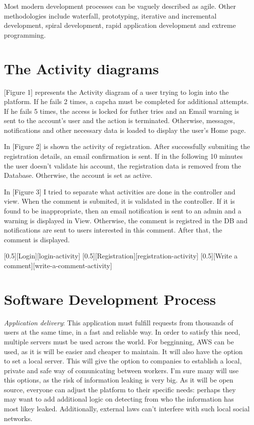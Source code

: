 \documentclass{article}
\begin{document}
			Most modern development processes can be vaguely described as agile. Other methodologies include waterfall, prototyping, iterative and incremental development, spiral development, rapid application development and extreme programming.

	\section{The Activity diagrams}
		[Figure 1] represents the Activity diagram of a user trying to login into the platform. If he fails 2 times, a capcha must be completed for additional attempts. If he fails 5 times, the access is locked for futher tries and an Email warning is sent to the account's user and the action is terminated. Otherwise, messages, notifications and other necessary data is loaded to display the user's Home page.

		\bigskip
		In [Figure 2] is shown the activity of registration. After successfully submiting the registration details, an email confirmation is sent. If in the following 10 minutes the user doesn't validate his account, the registration data is removed from the Database. Otherwise, the account is set as active.

		\bigskip
		In [Figure 3] I tried to separate what activities are done in the controller and view. When the comment is submited, it is validated in the controller. If it is found to be inappropriate, then an email notification is sent to an admin and a warning is displayed in View. Otherwise, the comment is registred in the DB and notifications are sent to users interested in this comment. After that, the comment is displayed.

		[0.5][Login][login-activity]
		[0.5][Registration][registration-activity]
		[0.5][Write a comment][write-a-comment-activity]


	\section{Software Development Process}
		\textit{Application delivery}: This application must fulfill requests from thousands of users at the same time, in a fast and reliable way. In order to satisfy this need, multiple servers must be used across the world. For begginning, AWS can be used, as it is will be easier and cheaper to maintain. It will also have the option to set a local server. This will give the option to companies to establish a local, private and safe way of comunicating between workers. I'm sure many will use this options, as the risk of information leaking is very big. As it will be open source, everyone can adjust the platform to their specific needs: perhaps they may want to add additional logic on detecting from who the information has most likey leaked. Additionally, external laws can't interfere with such local social networks.
\end{document}
